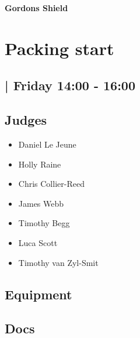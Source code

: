 \documentclass[10pt]{article}
\newcommand{\newtitle}[1]{\begin{center}{\Huge\bfseries #1 }\\ \vspace{5mm}\end{center}}
\begin{document}
	
	\newtitle{Gordons Shield}


		\begin{minipage}{\linewidth}
		\setcounter{section}{0}
	\section{Packing start }
	\subsection*{ | Friday 14:00 - 16:00}

	

	\begin{multicols}{2}
	\subsection*{\faUsers \: Judges}
	\begin{itemize}
			\item Daniel Le Jeune
			\item Holly Raine
			\item Chris Collier-Reed
			\item James Webb
			\item Timothy Begg
			\item Luca Scott
			\item Timothy van Zyl-Smit
		\end{itemize}
	\columnbreak
	\subsection*{\faWrench \: Equipment}
	        \vfill\null
        \subsection*{\faFile \: Docs}
     	\end{multicols}


	\vspace{1cm}
	\end{minipage}
\end{document}

